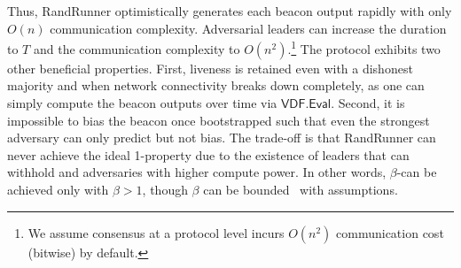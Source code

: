 
Thus, RandRunner optimistically generates each beacon output rapidly with only $O(n)$ communication complexity. Adversarial leaders can increase the \epoch duration to $T$ and the communication complexity to $O(n^2)$.\footnote{We assume consensus at a protocol level incurs $O(n^2)$ communication cost (bitwise) by default.}
The protocol exhibits two other beneficial properties. First, liveness is retained even with a dishonest majority and when network connectivity breaks down completely, as one can simply compute the beacon outputs over time via $\mathsf{VDF.Eval}$. Second, it is impossible to bias the beacon once bootstrapped such that even the strongest adversary can only predict but not bias. The trade-off is that RandRunner can never achieve the ideal 1-\interunpredictability property due to the existence of leaders that can withhold and adversaries with higher compute power. In other words, $\beta$-\interunpredictability can be achieved only with $\beta>1$, though $\beta$ can be bounded~\cite{schindler2021randrunner} with assumptions.
